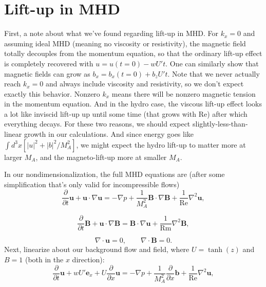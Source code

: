 \documentclass[%
 preprint,
 amsmath,amssymb,
 aps,
]{revtex4-2}
\begin{document}
\section{Lift-up in MHD}
First, a note about what we've found regarding lift-up in MHD. For $k_x = 0$ and assuming ideal MHD (meaning no viscosity or resistivity), the magnetic field totally decouples from the momentum equation, so that the ordinary lift-up effect is completely recovered with $u = u(t=0) - wU't$. One can similarly show that magnetic fields can grow as $b_x = b_x(t=0) + b_zU't$. Note that we never actually reach $k_x = 0$ and always include viscosity and resistivity, so we don't expect exactly this behavior. Nonzero $k_x$ means there will be nonzero magnetic tension in the momentum equation. And in the hydro case, the viscous lift-up effect looks a lot like inviscid lift-up up until some time (that grows with $\mathrm{Re}$) after which everything decays. For these two reasons, we should expect slightly-less-than-linear growth in our calculations. And since energy goes like $\int d^3x [ |u|^2 + |b|^2/M_A^2]$, we might expect the hydro lift-up to matter more at larger $M_A$, and the magneto-lift-up more at smaller $M_A$.

In our nondimensionalization, the full MHD equations are (after some simplification that's only valid for incompressible flows)
\begin{equation} \label{eq:momentum}
\frac{\partial}{\partial t} \mathbf{u} + \mathbf{u} \cdot \nabla \mathbf{u} = - \nabla p + \frac{1}{M_A^2} \mathbf{B} \cdot \nabla \mathbf{B} + \frac{1}{\mathrm{Re}} \nabla^2 \mathbf{u},
\end{equation}

\begin{equation} \label{eq:induction}
\frac{\partial}{\partial t} \mathbf{B} + \mathbf{u} \cdot \nabla \mathbf{B} = \mathbf{B} \cdot \nabla \mathbf{u} + \frac{1}{\mathrm{Rm}} \nabla^2 \mathbf{B},
\end{equation}

\begin{equation}
    \nabla \cdot \mathbf{u} = 0, \qquad \nabla \cdot \mathbf{B} = 0.
\end{equation}
Next, linearize about our background flow and field, where $U = \tanh(z)$ and $B = 1$ (both in the $x$ direction):
\begin{equation} \label{eq:lin-momentum}
\frac{\partial}{\partial t} \mathbf{u} + wU' \mathbf{e}_x + U \frac{\partial}{\partial x}\mathbf{u} = - \nabla p + \frac{1}{M_A^2} \frac{\partial}{\partial x}\mathbf{b} + \frac{1}{\mathrm{Re}} \nabla^2 \mathbf{u},
\end{equation}
\end{document}
